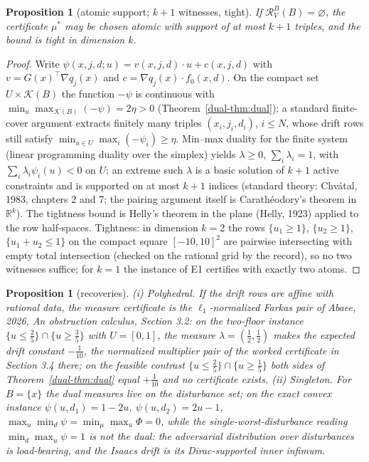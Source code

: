 \documentclass[10pt,twocolumn]{article}
\theoremstyle{plain}
\newtheorem{proposition}[theorem]{Proposition}
\theoremstyle{definition}
\theoremstyle{remark}
\begin{document}
\begin{proposition}[atomic support; $k+1$ witnesses, tight]
\label{dual-prop:sparse}
If $\mathcal{R}^{B}_{V}(B) = \varnothing$, the certificate $\mu^{*}$ may
be chosen atomic with support of at most $k+1$ triples, and the bound is
tight in dimension $k$.
\end{proposition}
\begin{proof}
Write $\psi(x,j,d;u) = v(x,j,d)\cdot u + c(x,j,d)$ with
$v = G(x)^{\top}\nabla q_{j}(x)$ and $c = \nabla q_{j}(x)\cdot f_{0}(x,d)$.
On the compact set $U \times \mathcal{K}(B)$ the function $-\psi$ is
continuous with
$\min_{u}\max_{\mathcal{K}(B)}(-\psi) = 2\eta > 0$ (Theorem~\ref{dual-thm:dual});
a standard finite-cover argument extracts finitely many triples
$(x_{i},j_{i},d_{i})$, $i \le N$, whose drift rows still satisfy
$\min_{u \in U}\max_{i}(-\psi_{i}) \ge \eta$. Min--max duality for the
finite system (linear programming duality over the simplex) yields
$\lambda \ge 0$, $\sum_{i}\lambda_{i} = 1$, with
$\sum_{i}\lambda_{i}\psi_{i}(u) < 0$ on $U$; an extreme such
$\lambda$ is a basic solution of $k+1$ active constraints and is supported
on at most $k+1$ indices (standard theory: Chv\'{a}tal, 1983, chapters 2
and 7; the pairing argument itself is Carath\'eodory's theorem in
$\mathbb{R}^{k}$). The tightness bound is Helly's theorem in the plane
(Helly, 1923) applied to the row half-spaces. Tightness: in dimension $k = 2$ the rows
$\{u_{1} \ge 1\}$, $\{u_{2} \ge 1\}$, $\{u_{1}+u_{2} \le 1\}$ on the
compact square $[-10,10]^{2}$ are pairwise intersecting with empty total
intersection (checked on the rational grid by the record), so no two
witnesses suffice; for $k = 1$ the instance of E1 certifies with exactly
two atoms.
\end{proof}

\begin{proposition}[recoveries]\label{dual-prop:recover}
(i) \emph{Polyhedral.} If the drift rows are affine with rational data,
the measure certificate is the $\ell_{1}$-normalized Farkas pair of
Abaee, 2026, An obstruction calculus, Section 3.2: on the two-floor instance
$\{u \le \tfrac25\} \cap \{u \ge \tfrac35\}$ with $U = [0,1]$, the
measure $\lambda = (\tfrac12,\tfrac12)$ makes the expected drift
\emph{constant} $-\tfrac1{10}$, the normalized multiplier pair of the
worked certificate in Section 3.4 there; on the feasible contrast
$\{u \le \tfrac25\} \cap \{u \ge \tfrac15\}$ both sides of
Theorem~\ref{dual-thm:dual} equal $+\tfrac1{10}$ and no certificate exists.
(ii) \emph{Singleton.} For $B = \{x\}$ the dual measures live on the
disturbance set; on the exact convex instance
$\psi(u,d_{1}) = 1-2u$, $\psi(u,d_{2}) = 2u-1$,
$\max_{u}\min_{d}\psi = \min_{\mu}\max_{u}\Phi = 0$, while the
single-worst-disturbance reading $\min_{d}\max_{u}\psi = 1$ is
\emph{not} the dual: the adversarial distribution over disturbances is
load-bearing, and the Isaacs drift is its Dirac-supported inner
infimum.
\end{proposition}
\end{document}
